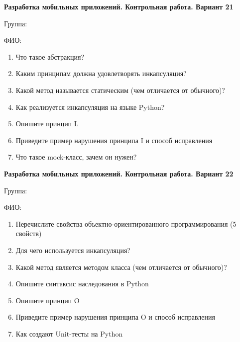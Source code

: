 \documentclass[12pt]{article}
\begin{document}
\vspace{40pt}\begin{minipage}{\textwidth}
\textbf{Разработка мобильных приложений. Контрольная работа. Вариант 21}

Группа: \underline{\hspace{3cm}}

ФИО: \underline{\hspace{10cm}}

\begin{enumerate}
\item Что такое абстракция?
\item Каким принципам должна удовлетворять инкапсуляция?
\item Какой метод называется статическим (чем отличается от обычного)?
\item Как реализуется инкапсуляция на языке Python?
\item Опишите принцип L
\item Приведите пример нарушения принципа I и способ исправления
\item Что такое mock-класс, зачем он нужен?

\end{enumerate}
\end{minipage}

\vspace{40pt}\begin{minipage}{\textwidth}
\textbf{Разработка мобильных приложений. Контрольная работа. Вариант 22}

Группа: \underline{\hspace{3cm}}

ФИО: \underline{\hspace{10cm}}

\begin{enumerate}
\item Перечислите свойства объектно-ориентированного программирования (5 свойств)
\item Для чего используется инкапсуляция?
\item Какой метод является методом класса (чем отличается от обычного)?
\item Опишите синтаксис наследования в Python
\item Опишите принцип O
\item Приведите пример нарушения принципа O и способ исправления
\item Как создают Unit-тесты на Python

\end{enumerate}
\end{minipage}
\end{document}
